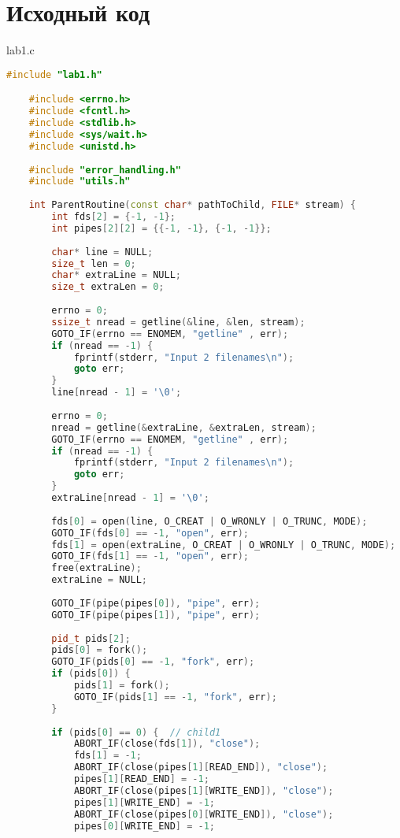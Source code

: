 \documentclass[a4paper, 12pt]{article}
\begin{document}
\newpage

\section{Исходный код}
lab1.c
\begin{lstlisting}[language=C++]
    #include "lab1.h"

    #include <errno.h>
    #include <fcntl.h>
    #include <stdlib.h>
    #include <sys/wait.h>
    #include <unistd.h>
    
    #include "error_handling.h"
    #include "utils.h"
    
    int ParentRoutine(const char* pathToChild, FILE* stream) {
        int fds[2] = {-1, -1};
        int pipes[2][2] = {{-1, -1}, {-1, -1}};
    
        char* line = NULL;
        size_t len = 0;
        char* extraLine = NULL;
        size_t extraLen = 0;
        
        errno = 0;
        ssize_t nread = getline(&line, &len, stream);
        GOTO_IF(errno == ENOMEM, "getline" , err);
        if (nread == -1) {
            fprintf(stderr, "Input 2 filenames\n");
            goto err;
        }
        line[nread - 1] = '\0';
    
        errno = 0;
        nread = getline(&extraLine, &extraLen, stream);
        GOTO_IF(errno == ENOMEM, "getline" , err);
        if (nread == -1) {
            fprintf(stderr, "Input 2 filenames\n");
            goto err;
        }
        extraLine[nread - 1] = '\0';
        
        fds[0] = open(line, O_CREAT | O_WRONLY | O_TRUNC, MODE);
        GOTO_IF(fds[0] == -1, "open", err);
        fds[1] = open(extraLine, O_CREAT | O_WRONLY | O_TRUNC, MODE);
        GOTO_IF(fds[1] == -1, "open", err);
        free(extraLine);
        extraLine = NULL;
    
        GOTO_IF(pipe(pipes[0]), "pipe", err);
        GOTO_IF(pipe(pipes[1]), "pipe", err);
    
        pid_t pids[2];
        pids[0] = fork();
        GOTO_IF(pids[0] == -1, "fork", err);
        if (pids[0]) {
            pids[1] = fork();
            GOTO_IF(pids[1] == -1, "fork", err);
        }
    
        if (pids[0] == 0) {  // child1
            ABORT_IF(close(fds[1]), "close");
            fds[1] = -1;
            ABORT_IF(close(pipes[1][READ_END]), "close");
            pipes[1][READ_END] = -1;
            ABORT_IF(close(pipes[1][WRITE_END]), "close");
            pipes[1][WRITE_END] = -1;
            ABORT_IF(close(pipes[0][WRITE_END]), "close");
            pipes[0][WRITE_END] = -1;
    

\end{lstlisting}
\end{document}
